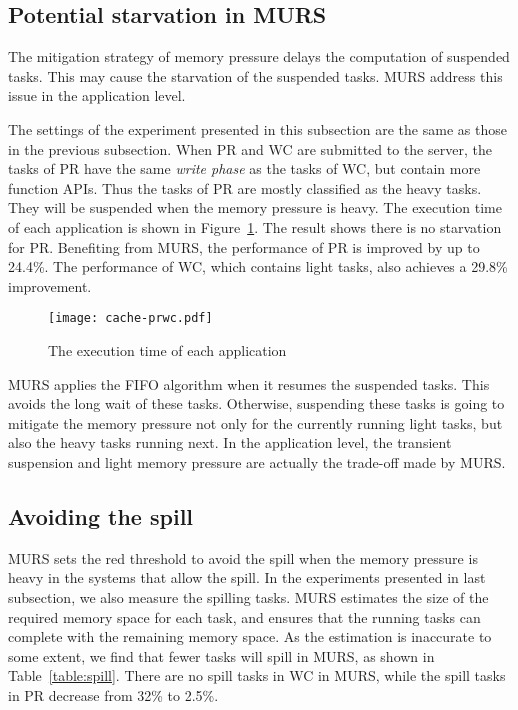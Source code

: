 \subsection{Potential starvation in MURS}

The mitigation strategy of memory pressure delays the computation of suspended tasks. This may cause the starvation of the suspended tasks. MURS address this issue in the application level.

The settings of the experiment presented in this subsection are the same as those in the previous subsection. When PR and WC are submitted to the server, the tasks of PR have the same \textit{write phase} as the tasks of WC, but contain more function APIs. Thus the tasks of PR are mostly classified as the heavy tasks. They will be suspended when the memory pressure is heavy. The execution time of each application is shown in Figure~\ref{fig:cache-prwc}. The result shows there is no starvation for PR. Benefiting from MURS, the performance of PR is improved by up to 24.4\%. The performance of WC, which contains light tasks, also achieves a 29.8\% improvement. 

\begin{figure}[!t]
\centering
\texttt{[image: cache-prwc.pdf]}
\caption{The execution time of each application}
\label{fig:cache-prwc}
\end{figure}

MURS applies the FIFO algorithm when it resumes the suspended tasks. This avoids the long wait of these tasks. Otherwise, suspending these tasks is going to mitigate the memory pressure not only for the currently running light tasks, but also the heavy tasks running next. In the application level, the transient suspension and light memory pressure are actually the trade-off made by MURS. 

\subsection{Avoiding the spill}

MURS sets the red threshold to avoid the spill when the memory pressure is heavy in the systems that allow the spill. In the experiments presented in last subsection, we also measure the spilling tasks. MURS estimates the size of the required memory space for each task, and ensures that the running tasks can complete with the remaining memory space. As the estimation is inaccurate to some extent, we find that fewer tasks will spill in MURS, as shown in Table~\ref{table:spill}. There are no spill tasks in WC in MURS, while the spill tasks in PR decrease from 32\% to 2.5\%.

